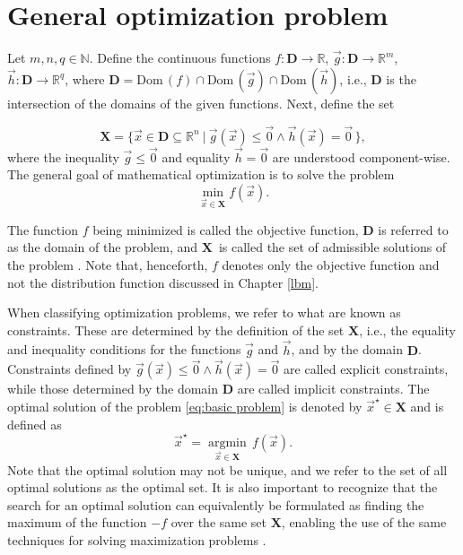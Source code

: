\section{General optimization problem}

Let $m, n, q \in \mathbb{N}$. Define the continuous functions $f : \mathbf{D} \rightarrow \mathbb{R}$, $ \vec{g} : \mathbf{D} \rightarrow \mathbb{R}^m$, $ \vec{h} : \mathbf{D} \rightarrow \mathbb{R}^q $, where $ \mathbf{D} = \mathrm{Dom} \, (f) \cap \mathrm{Dom} \, (\vec{g}) \cap \mathrm{Dom} \, (\vec{h})$, i.e., $ \mathbf{D} $ is the intersection of the domains of the given functions. Next, define the set

\begin{equation}\label{eq:admissible solution}
	\mathbf{X} = \big\{ \vec{x} \in \mathbf{D} \subseteq \mathbb{R}^n \ | \ \vec{g} (\vec{x}) \leq \vec{0} \wedge \vec{h} (\vec{x}) = \vec{0} \, \big\},
\end{equation}
where the inequality $ \vec{g} \leq \vec{0} $ and equality $ \vec{h} = \vec{0} $ are understood component-wise. The general goal of mathematical optimization is to solve the problem
\begin{equation}\label{eq:basic problem}
	\min_{\vec{x} \in \mathbf{X}} f(\vec{x}).
\end{equation}

The function $f$ being minimized is called the objective function, $\mathbf{D}$ is referred to as the domain of the problem, and $\mathbf{X}$~is called the set of admissible solutions of the problem \cite{Bert}. Note that, henceforth, $f$ denotes only the objective function and not the distribution function discussed in Chapter \ref{lbm}.

When classifying optimization problems, we refer to what are known as constraints. These are determined by the definition of the set $ \mathbf{X} $, i.e., the equality and inequality conditions for the functions $ \vec{g} $ and $ \vec{h} $, and by the domain $ \mathbf{D} $. Constraints defined by $ \vec{g} (\vec{x}) \leq \vec{0} \wedge \vec{h} (\vec{x}) = \vec{0} $ are called explicit constraints, while those determined by the domain $ \mathbf{D} $ are called implicit constraints.
\newpage
The optimal solution of the problem \eqref{eq:basic problem} is denoted by $ \vec{x}^{\star} \in \mathbf{X} $ and is defined as
\begin{equation}
	\vec{x}^{\star} = \operatorname*{argmin}_{\vec{x} \in \mathbf{X}} \, f(\vec{x}).
\end{equation}
Note that the optimal solution may not be unique, and we refer to the set of all optimal solutions as the optimal set. It is also important to recognize that the search for an optimal solution can equivalently be formulated as finding the maximum of the function $ -f$ over the same set $ \mathbf{X}$, enabling the use of the same techniques for solving maximization problems \cite{Bert, non-linear-textbook}.
